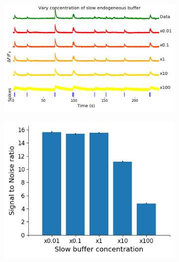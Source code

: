 \begin{figure}[p]
    \centering
    \begin{subfigure}{0.9\textwidth}
        \includegraphics[width=\linewidth]{figures/calcium_chapter/immobile_perturbed_fluorescence_18_paper.png}
        \caption{}
    \end{subfigure}
    \newline
    \begin{subfigure}{0.45\textwidth}
        \includegraphics[width=\linewidth]{figures/calcium_chapter/immobile_perturbed_snr.png}
        \caption{}
    \end{subfigure}
    \begin{subfigure}{0.45\textwidth}

\end{subfigure}
\end{figure}
